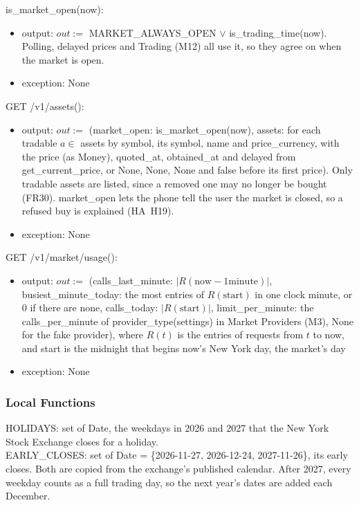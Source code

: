 \documentclass[12pt, titlepage]{article}
\begin{document}
\noindent is\_market\_open(now):
\begin{itemize}
\item output: $out := $ MARKET\_ALWAYS\_OPEN $\lor$ is\_trading\_time(now).
  Polling, delayed prices and Trading (M12) all use it, so they agree on when
  the market is open.
\item exception: None
\end{itemize}

\noindent GET /v1/assets():
\begin{itemize}
\item output: $out := $ (market\_open: is\_market\_open(now), assets: for each
  tradable $a \in$ assets by symbol, its symbol, name and price\_currency, with
  the price (as Money), quoted\_at, obtained\_at and delayed from
  get\_current\_price, or None, None, None and false before its first price).
  Only tradable assets are listed, since a removed one may no longer be bought
  (FR30). market\_open lets the phone tell the user the market is closed, so a
  refused buy is explained (HA~H19).
\item exception: None
\end{itemize}

\noindent GET /v1/market/usage():
\begin{itemize}
\item output: $out := $ (calls\_last\_minute: $|R(\text{now} - 1 \text{
  minute})|$, busiest\_minute\_today: the most entries of $R(\text{start})$ in
  one clock minute, or 0 if there are none, calls\_today:
  $|R(\text{start})|$, limit\_per\_minute: the
  calls\_per\_minute of provider\_type(settings) in Market Providers (M3), None
  for the fake provider), where $R(t)$ is the entries of requests from $t$ to
  now, and start is the midnight that begins now's New York day, the
  market's day
\item exception: None
\end{itemize}

\subsubsection{Local Functions}

\noindent HOLIDAYS: set of Date, the weekdays in 2026 and 2027 that the New
York Stock Exchange closes for a holiday.\\
EARLY\_CLOSES: set of Date = \{2026-11-27, 2026-12-24, 2027-11-26\}, its early
closes. Both are copied from the exchange's published calendar. After 2027,
every weekday counts as a full trading day, so the next year's dates are added
each December.
\end{document}
